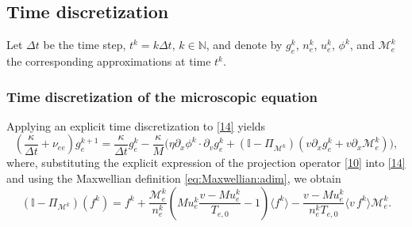 \documentclass[pdflatex,final,10pt]{article}
\newcommand{\Del}[1]{#1}
\begin{document}
\subsection{Time discretization}

Let $\Delta t$ be the time step, $t^k=k\Delta t$, $k\in\mathbb{N}$,
and denote by $g_e^k$, $n_e^k$, $u_e^k$, $\phi^k$, and
$\mathcal{M}_e^k$ the corresponding approximations at time $t^k$.

\subsubsection{Time discretization of the microscopic equation}

Applying an explicit time discretization to \eqref{14} yields
\Del{\begin{equation}\label{17}
    \left(\frac{\kappa}{\Delta t}+\nu_{ee}\right)g_e^{k+1}
    = \frac{\kappa}{\Delta t}g_e^k -\frac{\kappa}{M}\Big( \eta
    \partial_x\phi^k\cdot\partial_v g_e^k +(\mathbb{I}-\Pi_{\mathcal{M}^k})(v\partial_xg_e^k+v\partial_x\mathcal{M}_e^k) \Big),
\end{equation}
where, substituting the explicit expression of the projection operator \eqref{10} into \eqref{14} and using the Maxwellian definition \eqref{eq:Maxwellian:adim}, we obtain
\begin{equation}\label{17:Bis}
(\mathbb{I}-\Pi_{\mathcal{M}^k})(f^k)=
        f^k
        +\frac{\mathcal{M}_e^k}{n_e^k}
        \left(
            Mu_e^k\frac{v-Mu_e^k}{T_{e,0}}-1
        \right)
        \langle f^k\rangle
        -\frac{v-Mu_e^k}{n_e^kT_{e,0}}
        \langle v \,f^k\rangle\mathcal{M}_e^k.
\end{equation}}
\end{document}
